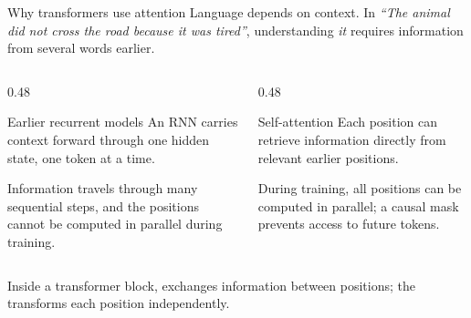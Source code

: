 \documentclass[aspectratio=169,10pt]{beamer}
\begin{document}
\begin{frame}{Why transformers use attention}
  Language depends on context. In \emph{``The animal did not cross the road
  because it was tired''}, understanding \emph{it} requires information from
  several words earlier.
  \vspace{0.5em}
  \begin{columns}[T]
    \begin{column}{0.48\textwidth}
      \begin{block}{Earlier recurrent models}
        An RNN carries context forward through one hidden state, one token at a
        time.
        \vspace{0.3em}

        Information travels through many sequential steps, and the positions
        cannot be computed in parallel during training.
      \end{block}
    \end{column}
    \begin{column}{0.48\textwidth}
      \begin{block}{Self-attention}
        Each position can retrieve information directly from relevant earlier
        positions.
        \vspace{0.3em}

        During training, all positions can be computed in parallel; a causal
        mask prevents access to future tokens.
      \end{block}
    \end{column}
  \end{columns}
  \vfill
  Inside a transformer block,  exchanges information between
  positions; the  transforms each position
  independently.
\end{frame}
\end{document}
